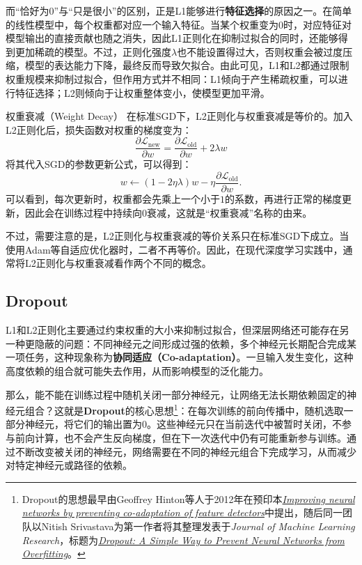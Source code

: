而“恰好为$0$”与“只是很小”的区别，正是L1能够进行\textbf{特征选择}的原因之一。在简单的线性模型中，每个权重都对应一个输入特征。当某个权重变为$0$时，对应特征对模型输出的直接贡献也随之消失，因此L1正则化在抑制过拟合的同时，还能够得到更加稀疏的模型。不过，正则化强度$\lambda$也不能设置得过大，否则权重会被过度压缩，模型的表达能力下降，最终反而导致欠拟合。由此可见，L1和L2都通过限制权重规模来抑制过拟合，但作用方式并不相同：L1倾向于产生稀疏权重，可以进行特征选择；L2则倾向于让权重整体变小，使模型更加平滑。

\begin{purpleBox}{权重衰减（Weight Decay）}
在标准SGD下，L2正则化与权重衰减是等价的。加入L2正则化后，损失函数对权重的梯度变为：
$$
\frac{\partial\mathcal{L}_{\text{new}}}{\partial w} = \frac{\partial\mathcal{L}_{\text{old}}}{\partial w} + 2\lambda w
$$
将其代入SGD的参数更新公式，可以得到：
$$
w\leftarrow(1-2\eta\lambda)w-\eta\frac{\partial\mathcal{L}_{\text{old}}}{\partial w}.
$$
可以看到，每次更新时，权重都会先乘上一个小于$1$的系数，再进行正常的梯度更新，因此会在训练过程中持续向$0$衰减，这就是“权重衰减”名称的由来。

不过，需要注意的是，L2正则化与权重衰减的等价关系只在标准SGD下成立。当使用Adam等自适应优化器时，二者不再等价。因此，在现代深度学习实践中，通常将L2正则化与权重衰减看作两个不同的概念。
\end{purpleBox}

\subsection{Dropout}

L1和L2正则化主要通过约束权重的大小来抑制过拟合，但深层网络还可能存在另一种更隐蔽的问题：不同神经元之间形成过强的依赖，多个神经元长期配合完成某一项任务，这种现象称为\textbf{协同适应（Co-adaptation）}。一旦输入发生变化，这种高度依赖的组合就可能失去作用，从而影响模型的泛化能力。

那么，能不能在训练过程中随机关闭一部分神经元，让网络无法长期依赖固定的神经元组合？这就是\textbf{Dropout}的核心思想\footnote{Dropout的思想最早由Geoffrey Hinton等人于2012年在预印本\href{https://arxiv.org/abs/1207.0580}{\textit{Improving neural networks by preventing co-adaptation of feature detectors}}中提出，随后同一团队以Nitish Srivastava为第一作者将其整理发表于\textit{Journal of Machine Learning Research}，标题为\href{https://jmlr.org/papers/v15/srivastava14a.html}{\textit{Dropout: A Simple Way to Prevent Neural Networks from Overfitting}}。}：在每次训练的前向传播中，随机选取一部分神经元，将它们的输出置为$0$。这些神经元只在当前迭代中被暂时关闭，不参与前向计算，也不会产生反向梯度，但在下一次迭代中仍有可能重新参与训练。通过不断改变被关闭的神经元，网络需要在不同的神经元组合下完成学习，从而减少对特定神经元或路径的依赖。

